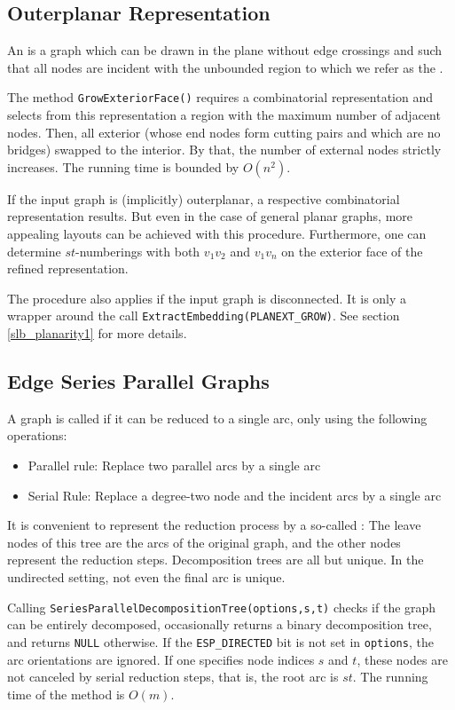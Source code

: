 \documentclass[a4paper,11pt,twoside]{book}
\begin{document}
\begin{multicols}{2}
\subsection{Outerplanar Representation}
An  is a graph which can be drawn in the plane without
edge crossings and such that all nodes are incident with the unbounded region
to which we refer as the .

The method \verb/GrowExteriorFace()/ requires a combinatorial representation and
selects from this representation a region with the maximum number of adjacent nodes.
Then, all exterior  (whose end nodes form cutting pairs and which
are no bridges) swapped to the interior. By that, the number of external nodes
strictly increases. The running time is bounded by $O(n^2)$.

If the input graph is (implicitly) outerplanar, a respective combinatorial
representation results. But even in the case of general planar graphs, more
appealing layouts can be achieved with this procedure. Furthermore, one can
determine $st$-numberings with both $v_1 v_2$ and $v_1 v_n$ on the exterior
face of the refined representation.

The procedure also applies if the input graph is disconnected. It is only a
wrapper around the call \verb/ExtractEmbedding(PLANEXT_GROW)/. See section
\ref{slb_planarity1} for more details.


\subsection{Edge Series Parallel Graphs}
\label{slb_series_parallel}
A graph is called  if it can be reduced to a
single arc, only using the following operations:
\begin{itemize}
\item Parallel rule: Replace two parallel arcs by a single arc
\item Serial Rule: Replace a degree-two node and the incident arcs by a single arc
\end{itemize}
It is convenient to represent the reduction process by a so-called
: The leave nodes of this tree are the arcs of the
original graph, and the other nodes represent the reduction steps.
Decomposition trees are all but unique. In the undirected setting,
not even the final arc is unique.

Calling \verb/SeriesParallelDecompositionTree(options,s,t)/ checks
if the graph can be entirely decomposed, occasionally returns a
binary decomposition tree, and returns \verb/NULL/ otherwise. If the
\verb/ESP_DIRECTED/ bit is not set in \verb/options/, the arc orientations
are ignored. If one specifies node indices $s$ and $t$, these nodes are not
canceled by serial reduction steps, that is, the root arc is $st$. The
running time of the method is $O(m)$.


\end{multicols}
\end{document}
